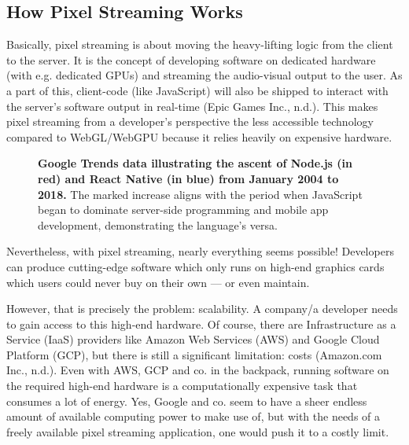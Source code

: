 \documentclass[10pt]{article}
\begin{document}
\begin{sloppypar}
  \subsection{How Pixel Streaming Works}
  \label{subsec:how-pixel-streaming-works}

  Basically, pixel streaming is about moving the heavy-lifting logic from the client to the server. It is the concept of developing software on dedicated hardware (with e.g. dedicated GPUs) and streaming the audio-visual output to the user. As a part of this, client-code (like JavaScript) will also be shipped to interact with the server’s software output in real-time (Epic Games Inc., n.d.). This makes pixel streaming from a developer’s perspective the less accessible technology compared to WebGL/WebGPU because it relies heavily on expensive hardware.

  \begin{figure}[ht]
    \centering
    \caption[Google Trends data illustrating the ascent of Node.js and React Native.]{\textbf{Google Trends data illustrating the ascent of Node.js (in red) and React Native (in blue) from January 2004 to 2018.} The marked increase aligns with the period when JavaScript began to dominate server-side programming and mobile app development, demonstrating the language’s versa.}
    \label{fig:pixel-streaming-architecture}
  \end{figure}

  Nevertheless, with pixel streaming, nearly everything seems possible! Developers can produce cutting-edge software which only runs on high-end graphics cards which users could never buy on their own — or even maintain.

  However, that is precisely the problem: scalability. A company/a developer needs to gain access to this high-end hardware. Of course, there are Infrastructure as a Service (IaaS) providers like Amazon Web Services (AWS) and Google Cloud Platform (GCP), but there is still a significant limitation: costs (Amazon.com Inc., n.d.). Even with AWS, GCP and co. in the backpack, running software on the required high-end hardware is a computationally expensive task that consumes a lot of energy. Yes, Google and co. seem to have a sheer endless amount of available computing power to make use of, but with the needs of a freely available pixel streaming application, one would push it to a costly limit.


\end{sloppypar}
\end{document}
